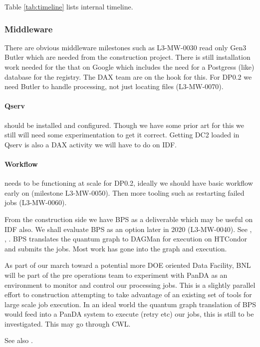 
Table \ref{tab:timeline} lists internal timeline.

\subsubsection{Middleware}
There are obvious middleware milestones such as L3-MW-0030 read only Gen3 Butler which are needed from the construction project.
There is still installation work needed for the that on Google which includes the need for a Postgress (like) database for the registry. The DAX team are on the hook for this.
For DP0.2 we need Butler to handle processing, not just locating files (L3-MW-0070).

\paragraph{Qserv} should be installed  and configured. Though we have some prior art for this we
still will need some experimentation to get it correct. Getting DC2 loaded in Qserv is also a DAX activity
we will have to do on IDF.

\paragraph{Workflow} needs to be functioning at scale for DP0.2, ideally we should have basic workflow
early on (milestone L3-MW-0050). Then more tooling such as restarting failed jobs (L3-MW-0060).

From the construction side we have BPS as a deliverable which may be useful on IDF also.
We shall evaluate BPS as an option later in 2020 (L3-MW-0040).
See , , .
BPS translates the quantum graph to DAGMan for execution on HTCondor and submits the jobs.
Most work has gone into the graph and execution.

As part of our march toward a potential more DOE oriented Data Facility, BNL will be part of the pre operations team to experiment with PanDA as an environment to monitor and control our processing jobs.
This is a slightly parallel effort to construction attempting to take advantage of an existing set of tools for large scale job execution.
In an ideal world the quantum graph translation of BPS would feed into a PanDA system to execute (retry etc) our jobs, this is still to be investigated. This may go through CWL.

See also .




